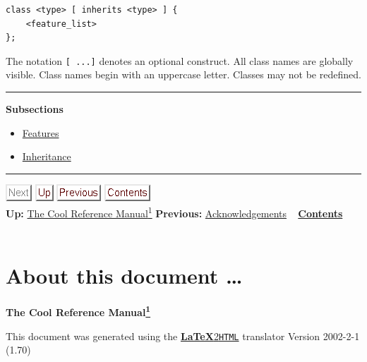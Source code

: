 \documentclass[]{article}
\begin{document}
\begin{verbatim}
class <type> [ inherits <type> ] {
    <feature_list>
};
\end{verbatim}

The notation \texttt{{[} ...{]}} denotes an optional construct. All
class names are globally visible. Class names begin with an uppercase
letter. Classes may not be redefined.

\begin{center}\rule{3in}{0.4pt}\end{center}

\textbf{Subsections}

\begin{itemize}
\itemsep1pt\parskip0pt
\item
  \href{node5.html}{Features}
\item
  \href{node6.html}{Inheritance}
\end{itemize}

\begin{center}\rule{3in}{0.4pt}\end{center}

\includegraphics{next_g.png}
\href{cool-manual.html}{\includegraphics{up.png}}
\href{node49.html}{\includegraphics{prev.png}}
\href{node1.html}{\includegraphics{contents.png}} \\ \textbf{Up:}
\href{cool-manual.html}{The Cool Reference Manual\textsuperscript{1}}
\textbf{Previous:} \href{node49.html}{Acknowledgements} ~
\textbf{\href{node1.html}{Contents}} \\ \\

\section{About this document \ldots{}}

\textbf{The Cool Reference
Manual\href{footnode.html\#foot266}{\textsuperscript{1}}}

This document was generated using the
\href{http://www.latex2html.org/}{\textbf{LaTeX}2\texttt{HTML}}
translator Version 2002-2-1 (1.70)
\end{document}
